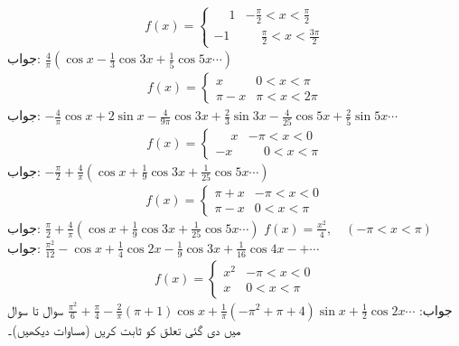 \begin{align*}
f(x)=
\begin{cases}
\phantom{-}1&-\frac{\pi}{2}<x<\frac{\pi}{2}\\
-1&\phantom{-} \frac{\pi}{2}<x<\frac{3\pi}{2}
\end{cases}
\end{align*}
جواب:\quad
$\tfrac{4}{\pi}(\cos x-\tfrac{1}{3}\cos 3x+\tfrac{1}{5}\cos 5x\cdots)$
\begin{align*}
f(x)=
\begin{cases}
x&0<x<\pi\\
\pi-x&\pi<x<2\pi
\end{cases}
\end{align*}
جواب:\quad
$-\tfrac{4}{\pi}\cos x+2\sin x-\tfrac{4}{9\pi}\cos 3x+\tfrac{2}{3}\sin 3x-\tfrac{4}{25}\cos 5x+\tfrac{2}{5}\sin 5x\cdots$
\begin{align*}
f(x)=
\begin{cases}
\phantom{-}x&-\pi<x<0\\
-x&\phantom{-}0<x<\pi
\end{cases}
\end{align*}
جواب:\quad
$-\tfrac{\pi}{2}+\tfrac{4}{\pi}(\cos x+\tfrac{1}{9}\cos 3x+\tfrac{1}{25}\cos 5x\cdots)$
\begin{align*}
f(x)=
\begin{cases}
\pi+x&-\pi<x<0\\
\pi-x&0<x<\pi
\end{cases}
\end{align*}
جواب:\quad
$\tfrac{\pi}{2}+\tfrac{4}{\pi}(\cos x+\tfrac{1}{9}\cos 3x+\tfrac{1}{25}\cos 5x\cdots)$
\quad
$f(x)=\frac{x^2}{4},\quad (-\pi<x<\pi)$\\
جواب:\quad
$\tfrac{\pi^2}{12}-\cos x+\tfrac{1}{4}\cos 2x-\tfrac{1}{9}\cos 3x+\tfrac{1}{16}\cos 4x-+\cdots$
\begin{align*}
f(x)=
\begin{cases}
x^2&-\pi<x<0\\
x&0<x<\pi
\end{cases}
\end{align*}
جواب:\quad
$\tfrac{\pi^2}{6}+\tfrac{\pi}{4}-\tfrac{2}{\pi}(\pi+1)\cos x+\tfrac{1}{\pi}(-\pi^2+\pi+4)\sin x+\tfrac{1}{2}\cos 2x\cdots$
سوال  تا سوال  میں دی گئی تعلق کو ثابت کریں (مساوات  دیکھیں)۔

